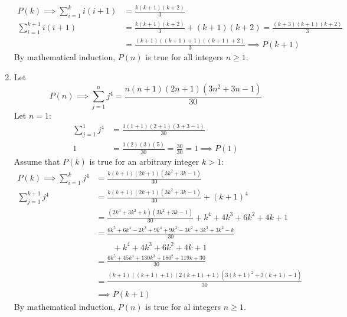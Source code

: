 \documentclass[12pt, A4]{article}
\begin{document}
\begin{enumerate}
						\begin{align*}
							P(k) \implies \sum_{i = 1}^k i(i + 1) &= \frac{k(k + 1)(k + 2)}{3} \\
							\sum_{i = 1}^{k + 1} i(i + 1) &= \frac{k(k + 1)(k + 2)}{3} + (k + 1)(k + 2)
									= \frac{(k + 3)(k + 1)(k + 2)}{3} \\
								&= \frac{(k + 1)((k + 1) + 1)((k + 1) + 2)}{3} \implies P(k + 1)
						\end{align*}
						By mathematical induction, \(P(n)\) is true for all integers \(n \ge 1\).
				\setcounter{enumi}{16}
				\item
					Let
						\[P(n) \implies \sum_{j = 1}^n j^4 = \frac{n(n + 1)(2n + 1)(3n^2 + 3n - 1)}{30}\]
						Let \(n = 1\):
						\begin{align*}
							\sum_{j = 1}^1 j^4 &= \frac{1(1 + 1)(2 + 1)(3 + 3 - 1)}{30} \\
							1 &= \frac{1(2)(3)(5)}{30}
									= \frac{30}{30} 
									= 1
									\implies P(1)
						\end{align*}
						Assume that \(P(k)\) is true for an arbitrary integer \(k > 1\):
						\begin{align*}
							P(k) \implies \sum_{i = 1}^k j^4 &= \frac{k(k + 1)(2k + 1)(3k^2 + 3k - 1)}{30} \\
							\sum_{j = 1}^{k + 1} j^4 &= \frac{k(k + 1)(2k + 1)(3k^2 + 3k - 1)}{30} + (k + 1)^4 \\
								&= \frac{(2k^3 + 3k^2 + k)(3k^2 + 3k - 1)}{30} + k^4 + 4k^3 + 6k^2 + 4k + 1 \\
								&= \frac{6k^5 + 6k^4 - 2k^3 + 9k^4 + 9k^3 - 3k^2 + 3k^3 + 3k^2 - k}{30} \\
								&\qquad + k^4 + 4k^3 + 6k^2 + 4k + 1 \\
								&= \frac{6k^5 + 45k^4 + 130k^3 + 180^2 + 119k + 30}{30} \\
								&= \frac{(k + 1)((k + 1) + 1)(2(k + 1) + 1)(3(k + 1)^2 + 3(k + 1) - 1)}{30} \\
								&\implies P(k + 1)
						\end{align*}
						By mathematical induction, \(P(n)\) is true for al integers \(n \ge 1\).
			\end{enumerate}
\end{document}
